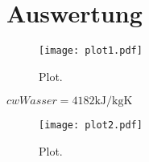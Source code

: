 \section{Auswertung}
\label{sec:Auswertung}

\begin{figure}
  \centering
  \texttt{[image: plot1.pdf]}
  \caption{Plot.}
  \label{fig:plot1}
\end{figure}






$cw Wasser= 4182 \si{\kilo\joule\per\kilo\gram\kelvin}$\cite[381]{PhyPrak}
\begin{figure}
  \centering
  \texttt{[image: plot2.pdf]}
  \caption{Plot.}
  \label{fig:plot2}
\end{figure}



